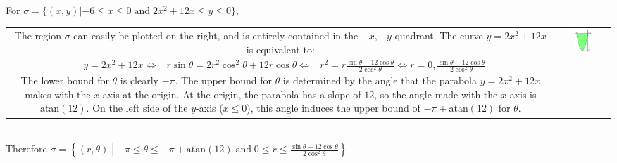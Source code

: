 \documentclass{article}
\newcommand{\atan}{\text{atan}}
\newcommand{\dr}[1]{\textcolor{dark_red}{#1}}
\begin{document}
\dr{\begin{framed}
For \(\sigma = \{(x,y) | -6 \leq x \leq 0 \;\text{and}\; 2x^2 + 12x \leq y \leq 0\}\), \\
\begin{tabular}{cc}
\parbox{0.6\textwidth}{
The region \(\sigma\) can easily be plotted on the right, and is entirely contained in the \(-x,-y\) quadrant. \\
The curve \(y = 2x^2 + 12x\) is equivalent to: \\
\begin{align*}
& y = 2x^2 + 12x \\
\iff & r\sin\theta = 2r^2\cos^2\theta + 12r\cos\theta \\
\iff & r^2 = r\frac{\sin\theta - 12\cos\theta}{2\cos^2\theta} 
\iff r = 0, \frac{\sin\theta - 12\cos\theta}{2\cos^2\theta} 
\end{align*}
The lower bound for \(\theta\) is clearly \(-\pi\). The upper bound for \(\theta\) is determined by the angle that the parabola \(y = 2x^2 + 12x\) makes with the \(x\)-axis at the origin. At the origin, the parabola has a slope of \(12\), so the angle made with the \(x\)-axis is \(\atan(12)\). On the left side of the \(y\)-axis (\(x \leq 0\)), this angle induces the upper bound of \(-\pi + \atan(12)\) for \(\theta\).
} & \parbox{0.4\textwidth}{
\includegraphics[width = 0.4\textwidth]{Test_bench_part_3x_images/Test_bench_part_3x_Solutions_image_7x}
}
\end{tabular} \\
Therefore \(\sigma = \left\{(r,\theta) \middle| -\pi \leq \theta \leq -\pi + \atan(12) \;\text{and}\; 0 \leq r \leq \frac{\sin\theta - 12\cos\theta}{2\cos^2\theta}\right\}\)
\end{framed}}



\end{document}
